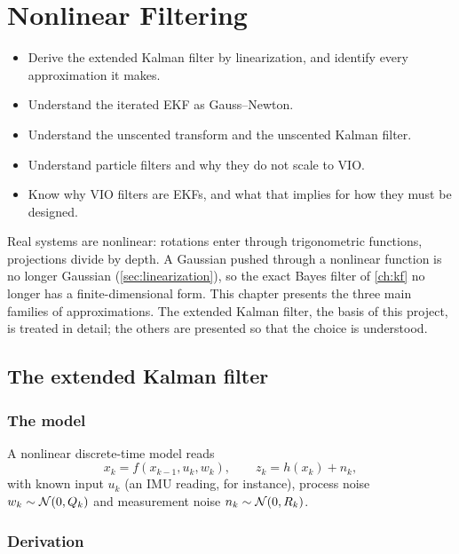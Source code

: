 \chapter{Nonlinear Filtering}
\label{ch:nonlinear}

\begin{objectives}
\begin{itemize}
  \item Derive the extended Kalman filter by linearization, and identify every approximation it makes.
  \item Understand the iterated EKF as Gauss--Newton.
  \item Understand the unscented transform and the unscented Kalman filter.
  \item Understand particle filters and why they do not scale to VIO.
  \item Know why VIO filters are EKFs, and what that implies for how they must be designed.
\end{itemize}
\end{objectives}

Real systems are nonlinear: rotations enter through trigonometric functions, projections divide by depth. A Gaussian pushed through a
nonlinear function is no longer Gaussian (\cref{sec:linearization}), so the exact Bayes filter of \cref{ch:kf} no longer has a finite-dimensional
form. This chapter presents the three main families of approximations. The extended Kalman filter, the basis of this project, is treated in
detail; the others are presented so that the choice is understood.

\section{The extended Kalman filter}

\subsection{The model}

A nonlinear discrete-time model reads
\begin{equation}
  x_k = f(x_{k-1}, u_k, w_k), \qquad z_k = h(x_k) + n_k,
  \label{eq:nonlinear-model}
\end{equation}
with known input $u_k$ (an IMU reading, for instance), process noise $w_k \sim \mathcal{N}(0, Q_k)$ and measurement noise $n_k \sim \mathcal{N}(0, R_k)$.

\subsection{Derivation}

